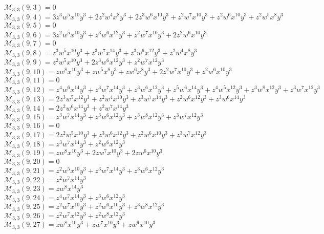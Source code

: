 \documentclass[12pt]{memoireuqam1.3}
\begin{document}
$\mathcal{M}_{3,3}(9,3)=0$\\
$\mathcal{M}_{3,3}(9,4)=3z^3w^5x^{10}y^3+2z^2w^4x^8y^3+2z^3w^6x^{10}y^3+z^2w^7x^{10}y^3+z^2w^6x^{10}y^3+z^2w^5x^8y^3$\\
$\mathcal{M}_{3,3}(9,5)=0$\\
$\mathcal{M}_{3,3}(9,6)=3z^2w^5x^{10}y^3+z^3w^6x^{12}y^3+z^2w^7x^{10}y^3+2z^2w^6x^{10}y^3$\\
$\mathcal{M}_{3,3}(9,7)=0$\\
$\mathcal{M}_{3,3}(9,8)=z^3w^5x^{10}y^3+z^3w^7x^{14}y^3+z^3w^6x^{12}y^3+z^2w^4x^8y^3$\\
$\mathcal{M}_{3,3}(9,9)=z^2w^5x^{10}y^3+2z^3w^6x^{12}y^3+z^2w^7x^{12}y^3$\\
$\mathcal{M}_{3,3}(9,10)=zw^8x^{10}y^3+zw^5x^8y^3+zw^6x^8y^3+2z^2w^7x^{10}y^3+z^2w^6x^{10}y^3$\\
$\mathcal{M}_{3,3}(9,11)=0$\\
$\mathcal{M}_{3,3}(9,12)=z^4w^6x^{14}y^3+z^3w^7x^{14}y^3+z^3w^6x^{12}y^3+z^5w^6x^{14}y^3+z^4w^5x^{12}y^3+z^3w^8x^{12}y^3+z^3w^7x^{12}y^3$\\
$\mathcal{M}_{3,3}(9,13)=2z^3w^5x^{12}y^3+z^2w^4x^{10}y^3+z^3w^7x^{14}y^3+z^2w^6x^{12}y^3+z^3w^6x^{14}y^3$\\
$\mathcal{M}_{3,3}(9,14)=2z^2w^6x^{14}y^3+z^2w^7x^{14}y^3$\\
$\mathcal{M}_{3,3}(9,15)=z^3w^7x^{14}y^3+z^3w^6x^{12}y^3+z^3w^8x^{12}y^3+z^3w^7x^{12}y^3$\\
$\mathcal{M}_{3,3}(9,16)=0$\\
$\mathcal{M}_{3,3}(9,17)=2z^2w^5x^{10}y^3+z^3w^6x^{12}y^3+z^2w^6x^{10}y^3+z^3w^7x^{12}y^3$\\
$\mathcal{M}_{3,3}(9,18)=z^3w^7x^{14}y^3+z^2w^6x^{12}y^3$\\
$\mathcal{M}_{3,3}(9,19)=zw^8x^{10}y^3+2zw^7x^{10}y^3+2zw^6x^{10}y^3$\\
$\mathcal{M}_{3,3}(9,20)=0$\\
$\mathcal{M}_{3,3}(9,21)=z^2w^5x^{10}y^3+z^3w^7x^{14}y^3+z^3w^6x^{12}y^3$\\
$\mathcal{M}_{3,3}(9,22)=z^2w^7x^{14}y^3$\\
$\mathcal{M}_{3,3}(9,23)=zw^8x^{14}y^3$\\
$\mathcal{M}_{3,3}(9,24)=z^4w^7x^{14}y^3+z^3w^6x^{12}y^3$\\
$\mathcal{M}_{3,3}(9,25)=z^2w^7x^{10}y^3+z^2w^6x^{10}y^3+z^3w^8x^{12}y^3$\\
$\mathcal{M}_{3,3}(9,26)=z^2w^7x^{12}y^3+z^2w^8x^{12}y^3$\\
$\mathcal{M}_{3,3}(9,27)=zw^8x^{10}y^3+zw^7x^{10}y^3+zw^9x^{10}y^3$\\
\end{document}
